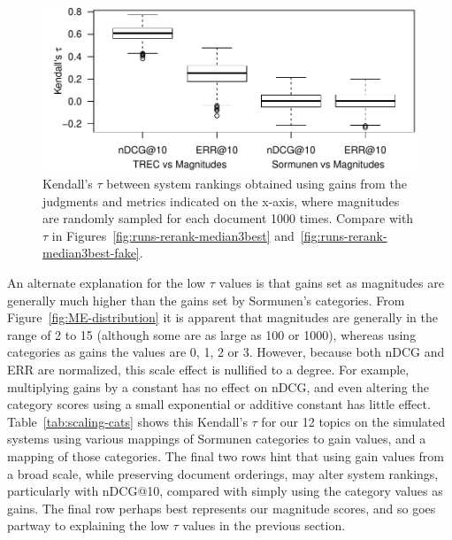 \begin{figure}[p]
  \centering
  \includegraphics[width=.7\linewidth]{figs/metrics_resample.pdf}
  \caption{Kendall's $\tau$ between system rankings obtained using gains from 
    the judgments and metrics indicated on the x-axis, where magnitudes are randomly
    sampled for each document 1000 times. Compare with $\tau$ in
Figures~\ref{fig:runs-rerank-median3best} and~\ref{fig:runs-rerank-median3best-fake}.
  \label{fig:runs-rerank-resample}
  }
\end{figure}




An alternate explanation for the low $\tau$ values is that gains set as
magnitudes are generally much higher than the gains set by Sormunen's
categories.
From Figure~\ref{fig:ME-distribution} it is apparent that magnitudes
are generally in the range of 2 to 15 (although some are as large as
100 or 1000), whereas using categories as gains the values are 0, 1, 2
or 3. However, because both nDCG and ERR are normalized, this scale
effect is nullified to a degree.
For example, multiplying gains by a constant has no effect on nDCG, and
even altering the category scores using a small exponential or additive
constant has little effect.
Table~\ref{tab:scaling-cats} shows this Kendall's $\tau$ for our 12
topics on the simulated systems using various mappings of Sormunen
categories to gain values, and a mapping of those categories.
The final two rows hint that using gain values from a broad scale,
while preserving document orderings, may alter system rankings,
particularly with nDCG@10, compared with simply using the category
values as gains.
The final row perhaps best represents our magnitude scores, and so goes
partway to explaining the low $\tau$ values in the previous section.


